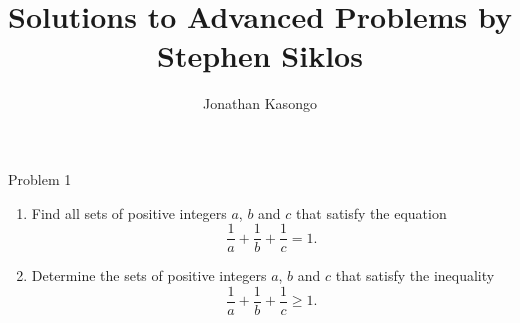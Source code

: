 \documentclass{article}
\author{Jonathan Kasongo}
\title{Solutions to Advanced Problems by Stephen Siklos}
\begin{document}
\maketitle

\begin{problem}{Problem 1}
\begin{enumerate}
  \item[(i)] Find all sets of positive integers $a$, $b$ and $c$ that satisfy the equation
  \[
    \frac{1}{a} + \frac{1}{b} + \frac{1}{c} = 1.
  \]

  \item[(ii)] Determine the sets of positive integers $a$, $b$ and $c$ that satisfy the inequality
  \[
    \frac{1}{a} + \frac{1}{b} + \frac{1}{c} \geq 1.
  \]
\end{enumerate}
\end{problem}
\end{document}
